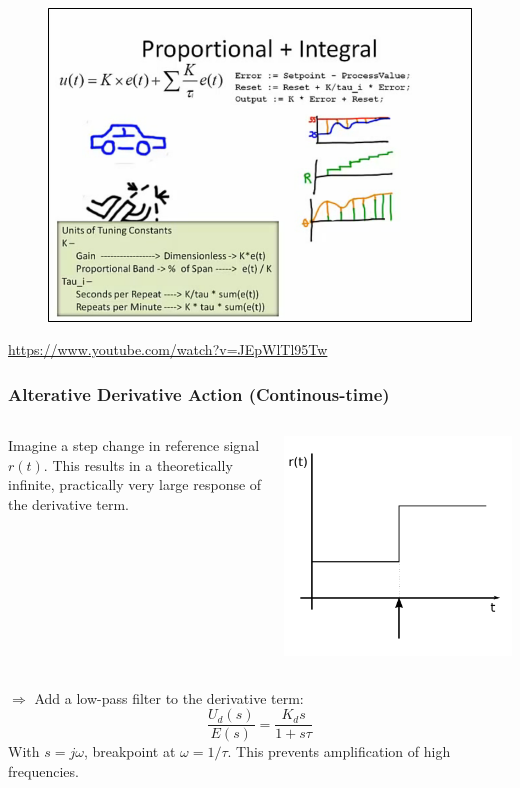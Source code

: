 \begin{frame}
	\begin{figure}
\centering
\includegraphics[width=0.7\linewidth]{img/PID_video}
\end{figure}
	\url{https://www.youtube.com/watch?v=JEpWlTl95Tw}
\end{frame}

\begin{frame}
	\frametitle{Alterative Derivative Action (Continous-time)}
		\begin{columns}
			\begin{column}{0.7\linewidth}
				Imagine a step change in reference signal $r(t)$. 
				This results in a theoretically infinite, practically very large response of
				the derivative term.  
			\end{column}
			\begin{column}{0.3\linewidth}
				\includegraphics[width=\linewidth]{img/piecewise-setpoint}
			\end{column}
		\end{columns}
		$\Rightarrow$ Add a low-pass filter to the derivative term:
		\begin{equation*}
			\frac{U_d(s)}{E(s)} = \frac{K_d s}{1+s\tau}
		\end{equation*}
		With $s=j\omega$, breakpoint at $\omega=1/\tau$. This prevents amplification of high frequencies. 
\end{frame}

